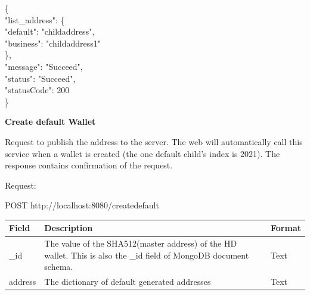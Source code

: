 \begin{framed}
    \hspace*{13mm}        \{ \\
    \hspace*{13mm}          "list\_address": \{ \\
    \hspace*{18mm}        "default": "childaddress", \\
    \hspace*{18mm}        "business": "childaddress1"    \\
    \hspace*{18mm}        \}, \\
    \hspace*{13mm}                "message": "Succeed",    \\
    \hspace*{13mm}                "status": "Succeed",    \\
    \hspace*{13mm}             "statusCode": 200    \\
    \hspace*{13mm}                 \}    \\

\end{framed}
    
\bigskip
{\textbf{Create default Wallet}}
\bigskip

Request to publish the address to the server. The web will automatically call this service when a wallet is created (the one default child’s index is 2021). The response contains confirmation of the request.

Request:

\begin{framed}
    POST http://localhost:8080/createdefault
\end{framed}

\begin{tabular}{| m{3cm} | m{9cm} | m{2.7cm} |}
    \hline
    Field & Description & Format                                            \\ \hline
    \_id & The value of the SHA512(master address) of the HD wallet. This is also the \_id field of MongoDB document schema.  & Text   \\ \hline
    address   & The dictionary of default generated addresses & Text    \\ \hline
\end{tabular}

